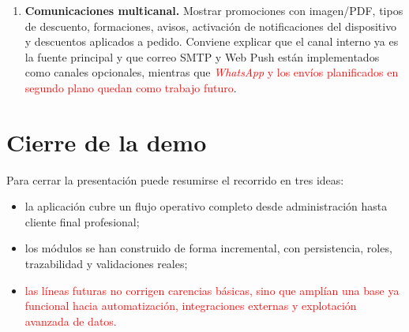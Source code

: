 \begin{enumerate}
    \item \textbf{Comunicaciones multicanal.} Mostrar promociones con imagen/PDF, tipos de descuento, formaciones, avisos, activación de notificaciones del dispositivo y descuentos aplicados a pedido. Conviene explicar que el canal interno ya es la fuente principal y que correo SMTP y Web Push están implementados como canales opcionales, mientras que \textcolor{red}{\textit{WhatsApp} y los envíos planificados en segundo plano quedan como trabajo futuro}.
\end{enumerate}

\section{Cierre de la demo}

Para cerrar la presentación puede resumirse el recorrido en tres ideas:

\begin{itemize}
    \item la aplicación cubre un flujo operativo completo desde administración hasta cliente final profesional;
    \item los módulos se han construido de forma incremental, con persistencia, roles, trazabilidad y validaciones reales;
    \item \textcolor{red}{las líneas futuras no corrigen carencias básicas, sino que amplían una base ya funcional hacia automatización, integraciones externas y explotación avanzada de datos.}
\end{itemize}
